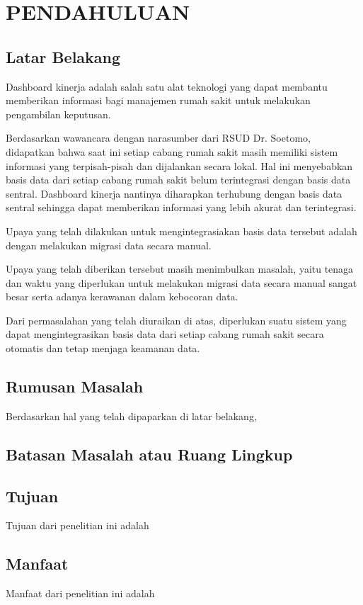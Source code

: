 \chapter{PENDAHULUAN}

\section{Latar Belakang}

Dashboard kinerja adalah salah satu alat teknologi yang dapat membantu memberikan informasi bagi manajemen rumah sakit untuk
melakukan pengambilan keputusan.

Berdasarkan wawancara dengan narasumber dari RSUD Dr. Soetomo, didapatkan bahwa saat ini setiap cabang rumah sakit masih memiliki 
sistem informasi yang terpisah-pisah dan dijalankan secara lokal. Hal ini menyebabkan basis data dari setiap cabang rumah sakit belum terintegrasi dengan basis data sentral. 
Dashboard kinerja nantinya diharapkan terhubung dengan basis data sentral sehingga dapat memberikan informasi yang lebih akurat dan terintegrasi.

Upaya yang telah dilakukan untuk mengintegrasiakan basis data tersebut adalah dengan melakukan migrasi data secara manual.

Upaya yang telah diberikan tersebut masih menimbulkan masalah, yaitu tenaga dan waktu yang diperlukan untuk melakukan migrasi data secara manual sangat besar serta adanya kerawanan dalam kebocoran data.

Dari permasalahan yang telah diuraikan di atas, diperlukan suatu sistem yang dapat mengintegrasikan basis data dari setiap cabang rumah sakit secara otomatis dan tetap menjaga keamanan data.

\section{Rumusan Masalah}

Berdasarkan hal yang telah dipaparkan di latar belakang, \lipsum[4]

\section{Batasan Masalah atau Ruang Lingkup}

\lipsum[6]

\section{Tujuan}

Tujuan dari penelitian ini adalah \lipsum[7][1-14]

\section{Manfaat}

Manfaat dari penelitian ini adalah \lipsum[8][1-14]
